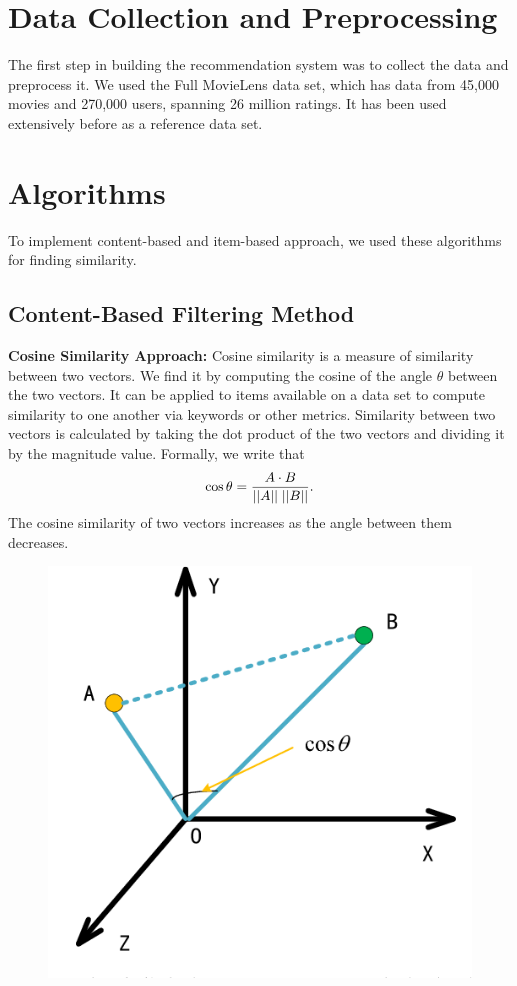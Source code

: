 \documentclass[10pt,conference]{IEEEtran}
\begin{document}
\section{Data Collection and Preprocessing}\label{sec:2 Data Collection and Preprocessing}
The first step in building the recommendation system was to collect the data and preprocess it.
We used the Full MovieLens data set, which has data from 45,000 movies and 270,000 users, spanning 26 million ratings.
It has been used extensively before as a reference data set.

\section{Algorithms}\label{sec: 3: Algorithms}
To implement content-based and item-based approach, we used these algorithms for finding similarity.

\subsection{Content-Based Filtering Method}

\textbf{Cosine Similarity Approach:}
Cosine similarity is a measure of similarity between two vectors.
We find it by computing the cosine of the angle $\theta$ between the two vectors.
It can be applied to items available on a data set to compute similarity to one another via keywords or other metrics.
Similarity between two vectors is calculated by taking the dot product of the two vectors and dividing it by the magnitude value.
Formally, we write that
\begin{equation*}
	\cos{\theta} = \frac{A \cdot B}{||A|| \hspace{1mm} ||B||}.
\end{equation*}
The cosine similarity of two vectors increases as the angle between them decreases.

\begin{figure}[h!]
	\centering
	\includegraphics[scale=.3]{3Dspace.png}
	\label{fig:KNN}
\end{figure}
\end{document}
